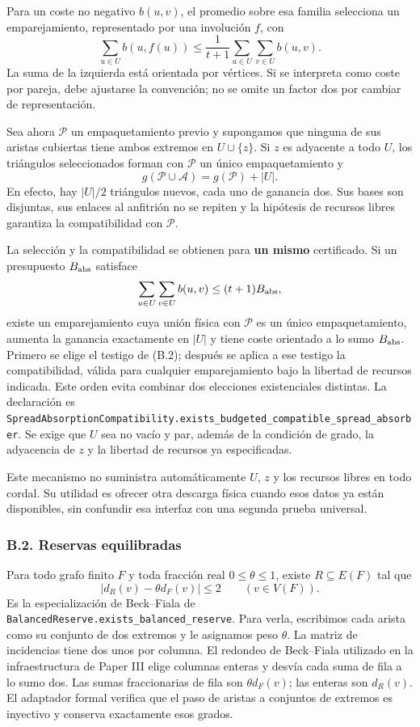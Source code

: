 \documentclass[spanish,11pt,a4paper]{article}
\begin{document}
Para un coste no negativo \(b(u,v)\), el promedio sobre esa familia selecciona un emparejamiento, representado por una involución \(f\), con \[
\sum_{u\in U}b(u,f(u))
\le\frac1{t+1}\sum_{u\in U}\sum_{v\in U}b(u,v).
\tag{B.2}
\] La suma de la izquierda está orientada por vértices. Si se interpreta como coste por pareja, debe ajustarse la convención; no se omite un factor dos por cambiar de representación.

Sea ahora \(\mathcal P\) un empaquetamiento previo y supongamos que ninguna de sus aristas cubiertas tiene ambos extremos en \(U\cup\{z\}\). Si \(z\) es adyacente a todo \(U\), los triángulos seleccionados forman con \(\mathcal P\) un único empaquetamiento y \[
g(\mathcal P\cup\mathcal A)=g(\mathcal P)+|U|.
\tag{B.3}
\] En efecto, hay \(|U|/2\) triángulos nuevos, cada uno de ganancia dos. Sus bases son disjuntas, sus enlaces al anfitrión no se repiten y la hipótesis de recursos libres garantiza la compatibilidad con \(\mathcal P\).

La selección y la compatibilidad se obtienen para \textbf{un mismo} certificado. Si un presupuesto \(B_{\rm abs}\) satisface \[
\sum_{u\in U}\sum_{v\in U}b(u,v)\le(t+1)B_{\rm abs},
\] existe un emparejamiento cuya unión física con \(\mathcal P\) es un único empaquetamiento, aumenta la ganancia exactamente en \(|U|\) y tiene coste orientado a lo sumo \(B_{\rm abs}\). Primero se elige el testigo de (B.2); después se aplica a ese testigo la compatibilidad, válida para cualquier emparejamiento bajo la libertad de recursos indicada. Este orden evita combinar dos elecciones existenciales distintas. La declaración es \nolinkurl{SpreadAbsorptionCompatibility.exists_budgeted_compatible_spread_absorber}. Se exige que \(U\) sea no vacío y par, además de la condición de grado, la adyacencia de \(z\) y la libertad de recursos ya especificadas.

Este mecanismo no suministra automáticamente \(U\), \(z\) y los recursos libres en todo cordal. Su utilidad es ofrecer otra descarga física cuando esos datos ya están disponibles, sin confundir esa interfaz con una segunda prueba universal.

\subsubsection{B.2. Reservas equilibradas}\label{b.2.-reservas-equilibradas}

Para todo grafo finito \(F\) y toda fracción real \(0\le\theta\le1\), existe \(R\subseteq E(F)\) tal que \[
|d_R(v)-\theta d_F(v)|\le2\qquad(v\in V(F)).
\tag{B.4}
\] Es la especialización de Beck--Fiala de \nolinkurl{BalancedReserve.exists_balanced_reserve}. Para verla, escribimos cada arista como su conjunto de dos extremos y le asignamos peso \(\theta\). La matriz de incidencias tiene dos unos por columna. El redondeo de Beck--Fiala utilizado en la infraestructura de Paper III elige columnas enteras y desvía cada suma de fila a lo sumo dos. Las sumas fraccionarias de fila son \(\theta d_F(v)\); las enteras son \(d_R(v)\). El adaptador formal verifica que el paso de aristas a conjuntos de extremos es inyectivo y conserva exactamente esos grados.
\end{document}
